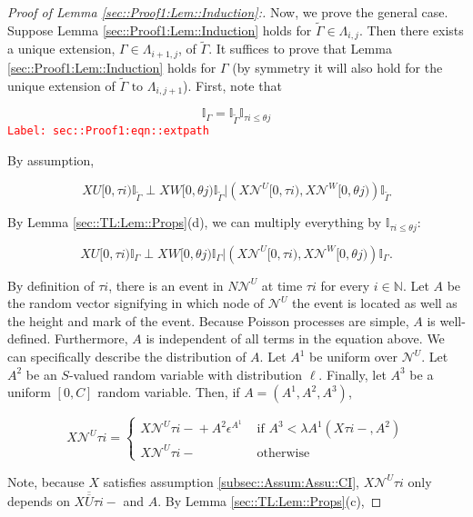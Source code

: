 \documentclass[12pt]{article}
\newcommand{\mb}{\mathbb}
\newcommand{\mc}{\mathcal}
\newcommand{\ov}{\overline}
\newcommand{\te}{\text}
\newcommand{\ep}{\epsilon}
\newcommand{\tr}{\textcolor{red}}
\newcommand{\labe}[1]{\tr{\texttt{Label: #1}}}
\newcommand{\ind}{\hspace{24pt}}
\renewcommand{\U}{U}							%
\newcommand{\UU}{W}								%
\renewcommand{\S}{S}							%
\newcommand{\ev}{\ep}							%
\newcommand{\X}{X}								%
\newcommand{\neigh}{\mc{N}}						%
\newcommand{\vind}[1]{^{#1}}					%
\newcommand{\cl}{\ov}							%
\newcommand{\const}{C}							%
\newcommand{\poiss}{N}							%
\newcommand{\Sm}{\ell}							%
\newcommand{\rate}{\lambda}						%
\newcommand{\alt}[1]{\widetilde{#1}}			%
\newcommand{\rt}{\tau}							%
\newcommand{\rtt}{\theta}						%
\newcommand{\apath}{\Gamma}						%
\newcommand{\pathset}[2]{\Lambda_{#1,#2}}		%
\newcommand{\rv}{A}								%
\begin{document}
\begin{proof}[Proof of Lemma \ref{sec::Proof1:Lem::Induction}:]
\ind Now, we prove the general case. Suppose Lemma \ref{sec::Proof1:Lem::Induction} holds for \(\alt{\apath{}} \in \pathset{i}{j}\). Then there exists a unique extension, \(\apath{} \in \pathset{i+1}{j}\), of \(\alt{\apath{}}\). It suffices to prove that Lemma \ref{sec::Proof1:Lem::Induction} holds for \(\apath{}\) (by symmetry it will also hold for the unique extension of \(\alt{\apath{}} \te{ to } \pathset{i}{j+1}\)). First, note that

\begin{equation}
\mb{I}_{\apath{}} = \mb{I}_{\alt{\apath{}}}\mb{I}_{\rt{i} \leq \rtt{j}}
\label{sec::Proof1:eqn::extpath}
\end{equation}
\labe{sec::Proof1:eqn::extpath}

By assumption,

\[\X{\U}{[0,\rt{i})}\mb{I}_{\alt{\apath{}}}\perp \X{\UU}{[0,\rtt{j})}\mb{I}_{\alt{\apath{}}}|\left(\X{\neigh\vind{\U}}{[0,\rt{i})},\X{\neigh\vind{\UU}}{[0,\rtt{j})}\right)\mb{I}_{\alt{\apath{}}}\]

By Lemma \ref{sec::TL:Lem::Props}(d), we can multiply everything by \(\mb{I}_{\rt{i} \leq \rtt{j}}\):

\[\X{\U}{[0,\rt{i})}\mb{I}_{\apath{}}\perp \X{\UU}{[0,\rtt{j})}\mb{I}_{\apath{}}|\left(\X{\neigh\vind{\U}}{[0,\rt{i})},\X{\neigh\vind{\UU}}{[0,\rtt{j})}\right)\mb{I}_{\apath{}}.\]

By definition of \(\rt{i}\), there is an event in \(\poiss{\neigh\vind{\U}}\) at time \(\rt{i}\) for every \(i \in \mb{ N}\). Let \(\rv\) be the random vector signifying in which node of \(\neigh\vind{\U}\) the event is located as well as the height and mark of the event. Because Poisson processes are simple, \(\rv\) is well-defined. Furthermore, \(\rv\) is independent of all terms in the equation above. We can specifically describe the distribution of \(\rv\). Let \(\rv^1\) be uniform over \(\neigh\vind{\U}\). Let \(\rv^2\) be an \(\S\)-valued random variable with distribution \(\Sm\). Finally, let \(\rv^3\) be a uniform \([0,\const{}]\) random variable. Then, if \(\rv=(\rv^1,\rv^2,\rv^3)\),

\[\X{\neigh\vind{\U}}{\rt{i}} = \begin{cases}
\X{\neigh\vind{\U}}{\rt{i}-} + \rv^2\ev\vind{\rv^1} &\te{ if } \rv^3< \rate{\rv^1}(\X{}{\rt{i}-}, \rv^2)\\
\X{\neigh\vind{\U}}{\rt{i}-} &\te{ otherwise}
\end{cases}\]

Note, because \(\X{}{}\) satisfies assumption \ref{subsec::Assum:Assu::CI}, \(\X{\neigh\vind{\U}}{\rt{i}}\) only depends on \(\X{\cl{\cl{\U}}}{\rt{i}-}\) and \(\rv\). By Lemma \ref{sec::TL:Lem::Props}(c), 


\end{proof}
\end{document}
